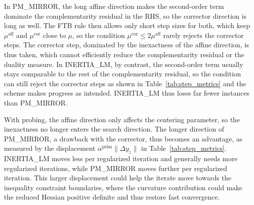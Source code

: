 \documentclass[class=scrbook, crop=false]{standalone}
\begin{document}
In \textsf{PM\_MIRROR}, the long affine direction makes the second-order term dominate the complementarity residual in the \gls{RHS},
so the corrector direction is long as well.
The \gls{FTB} rule then allows only short step sizes for both, which keep $\mu^{\mathrm{aff}}$ and $\mu^{\mathrm{cor}}$ close to $\mu$,
so the condition $\mu^{\mathrm{cor}} \le 2\mu^{\mathrm{aff}}$ rarely rejects the corrector steps.
The corrector step, dominated by the inexactness of the affine direction, is thus taken,
which cannot efficiently reduce the complementarity residual or the duality measure.
In \textsf{INERTIA\_LM}, by contrast, the second-order term usually stays comparable to the rest of the complementarity residual,
so the condition can still reject the corrector steps as shown in Table~\ref{tab:step_metrics} and the scheme makes progress as intended.
\textsf{INERTIA\_LM} thus loses far fewer instances than \textsf{PM\_MIRROR}.

With probing, the affine direction only affects the centering parameter,
so the inexactness no longer enters the search direction.
The longer direction of \textsf{PM\_MIRROR}, a drawback with the corrector, thus becomes an advantage,
as measured by the displacement $\alpha^{\mathrm{prim}}\|\Delta y_z\|$ in Table~\ref{tab:step_metrics}.
\textsf{INERTIA\_LM} moves less per regularized iteration and generally needs more regularized iterations,
while \textsf{PM\_MIRROR} moves further per regularized iteration.
This larger displacement could help the iterate move towards the inequality constraint boundaries,
where the curvature contribution could make the reduced Hessian positive definite and thus restore fast convergence.
\end{document}
